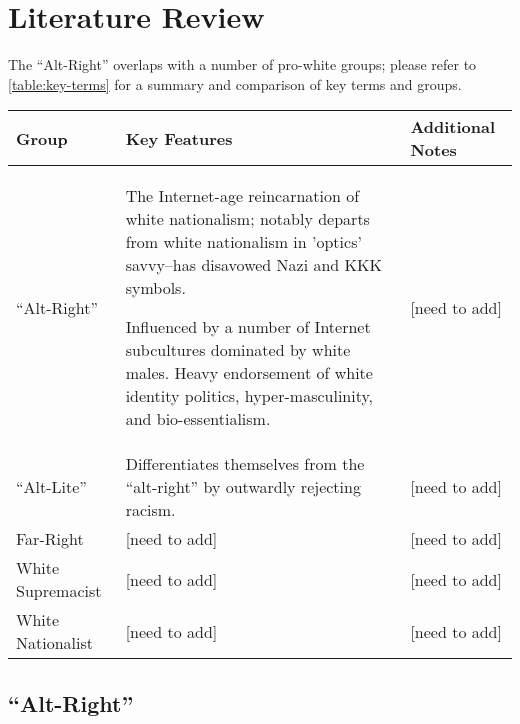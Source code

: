 \documentclass[acmlarge, screen, authorversion]{acmart}
\begin{document}
\section{Literature Review}

The ``Alt-Right'' overlaps with a number of pro-white groups; please refer to \ref{table:key-terms} for a summary and comparison of key terms and groups.

\begin{table*}

  \caption{Key Terms}
  \label{table:key-terms}
  
  \begin{tabular}{ p{2cm}  p{6cm}  p{4cm} }
  
    \toprule
     Group & Key Features &  Additional Notes\\ 
    \midrule
 ``Alt-Right'' & The Internet-age reincarnation of white nationalism; notably departs from white nationalism in 'optics' savvy--has disavowed Nazi and KKK symbols. 
 
 Influenced by a number of Internet subcultures dominated by white males. Heavy endorsement of white identity politics, hyper-masculinity, and bio-essentialism.  & [need to add] \\ 
 \hline
 ``Alt-Lite'' & Differentiates themselves from the ``alt-right'' by outwardly rejecting racism. & [need to add]\\
  \hline
 Far-Right & [need to add] & [need to add]\\
 \hline
 White Supremacist & [need to add] & [need to add]\\
  \hline
 White Nationalist & [need to add] & [need to add]\\
   \bottomrule
\end{tabular}
\end{table*}

\subsection{``Alt-Right''}
\end{document}

